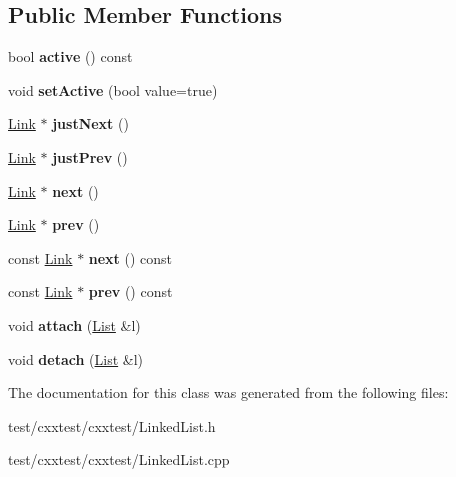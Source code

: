 \subsection*{Public Member Functions}
\begin{DoxyCompactItemize}
\item 
\hypertarget{classCxxTest_1_1Link_a2230eceb6d776394a32fddb1514cf93a}{bool {\bfseries active} () const }\label{classCxxTest_1_1Link_a2230eceb6d776394a32fddb1514cf93a}

\item 
\hypertarget{classCxxTest_1_1Link_aa06c69998cd5c34348bab11d46577b51}{void {\bfseries set\-Active} (bool value=true)}\label{classCxxTest_1_1Link_aa06c69998cd5c34348bab11d46577b51}

\item 
\hypertarget{classCxxTest_1_1Link_aa1c8015f02e8541749956f2d551dbed3}{\hyperlink{classCxxTest_1_1Link}{Link} $\ast$ {\bfseries just\-Next} ()}\label{classCxxTest_1_1Link_aa1c8015f02e8541749956f2d551dbed3}

\item 
\hypertarget{classCxxTest_1_1Link_ab77cb38969bd38f7b3491a455134c12c}{\hyperlink{classCxxTest_1_1Link}{Link} $\ast$ {\bfseries just\-Prev} ()}\label{classCxxTest_1_1Link_ab77cb38969bd38f7b3491a455134c12c}

\item 
\hypertarget{classCxxTest_1_1Link_a4c03b844ac15861f40d2355d650e8ec7}{\hyperlink{classCxxTest_1_1Link}{Link} $\ast$ {\bfseries next} ()}\label{classCxxTest_1_1Link_a4c03b844ac15861f40d2355d650e8ec7}

\item 
\hypertarget{classCxxTest_1_1Link_aedc0d2dc3d6f11f5d566c8c21ac7b660}{\hyperlink{classCxxTest_1_1Link}{Link} $\ast$ {\bfseries prev} ()}\label{classCxxTest_1_1Link_aedc0d2dc3d6f11f5d566c8c21ac7b660}

\item 
\hypertarget{classCxxTest_1_1Link_a949bdd1988b71318f3d58232344dc35a}{const \hyperlink{classCxxTest_1_1Link}{Link} $\ast$ {\bfseries next} () const }\label{classCxxTest_1_1Link_a949bdd1988b71318f3d58232344dc35a}

\item 
\hypertarget{classCxxTest_1_1Link_ac263414ff3438af00306bb2d0b6aa483}{const \hyperlink{classCxxTest_1_1Link}{Link} $\ast$ {\bfseries prev} () const }\label{classCxxTest_1_1Link_ac263414ff3438af00306bb2d0b6aa483}

\item 
\hypertarget{classCxxTest_1_1Link_ad69f02495f7a28842a4683ad436c5fb4}{void {\bfseries attach} (\hyperlink{structCxxTest_1_1List}{List} \&l)}\label{classCxxTest_1_1Link_ad69f02495f7a28842a4683ad436c5fb4}

\item 
\hypertarget{classCxxTest_1_1Link_ad3544121b85766c6f4a8b5b6fa98599e}{void {\bfseries detach} (\hyperlink{structCxxTest_1_1List}{List} \&l)}\label{classCxxTest_1_1Link_ad3544121b85766c6f4a8b5b6fa98599e}

\end{DoxyCompactItemize}


The documentation for this class was generated from the following files\-:\begin{DoxyCompactItemize}
\item 
test/cxxtest/cxxtest/Linked\-List.\-h\item 
test/cxxtest/cxxtest/Linked\-List.\-cpp\end{DoxyCompactItemize}
